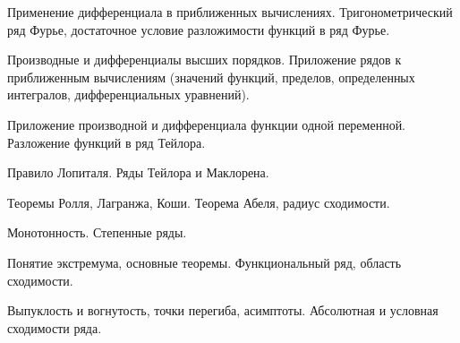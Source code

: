 \documentclass[
	14pt,
	a4paper,
	]
	{scrartcl}
\begin{document}
\vfill
\z Применение дифференциала в приближенных вычислениях.
 \vfill
\z Тригонометрический ряд Фурье, достаточное условие разложимости функций в ряд Фурье.
 \vfill

\vfill

\newpage


\shapk
{}
\setcounter{zad}{0}

\vfill
\z Производные и дифференциалы высших порядков.
 \vfill
\z Приложение рядов к приближенным вычислениям (значений функций, пределов, определенных интегралов, дифференциальных уравнений).
 \vfill

\vfill

\newpage


\shapk
{}
\setcounter{zad}{0}

\vfill
\z Приложение производной и дифференциала функции одной переменной.
 \vfill
\z Разложение функций в ряд Тейлора.
 \vfill

\vfill

\newpage


\shapk
{}
\setcounter{zad}{0}

\vfill
\z Правило Лопиталя.
 \vfill
\z Ряды Тейлора и Маклорена.
 \vfill

\vfill

\newpage


\shapk
{}
\setcounter{zad}{0}

\vfill
\z Теоремы Ролля, Лагранжа, Коши.
 \vfill
\z Теорема Абеля, радиус сходимости.
 \vfill

\vfill

\newpage


\shapk
{}
\setcounter{zad}{0}

\vfill
\z Монотонность.
 \vfill
\z Степенные ряды.
 \vfill

\vfill

\newpage


\shapk
{}
\setcounter{zad}{0}

\vfill
\z Понятие экстремума, основные теоремы.
 \vfill
\z Функциональный ряд, область сходимости.
 \vfill

\vfill

\newpage


\shapk
{}
\setcounter{zad}{0}

\vfill
\z Выпуклость и вогнутость, точки перегиба, асимптоты.
 \vfill
\z Абсолютная и условная сходимости ряда.
 \vfill
\end{document}

